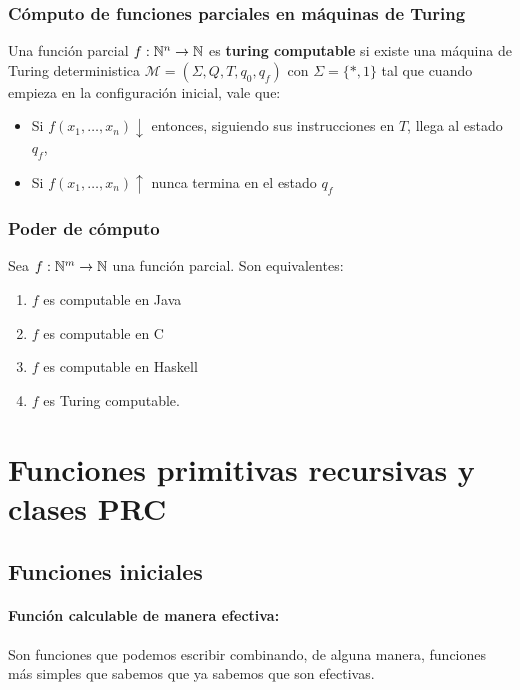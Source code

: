 	
	\subsubsection{Cómputo de funciones parciales en máquinas de Turing}
	Una función parcial $f:\mathbb{N}^n\to\mathbb{N}$ es \textbf{turing computable} si existe una máquina de Turing deterministica $\mathcal{M}=(\Sigma, Q, T, q_0, q_f)$ con $\Sigma=\{*,1\}$ tal que cuando empieza en la configuración inicial, vale que:
	
	\begin{itemize}
		\item Si $f(x_1,\dots, x_n)\downarrow$ entonces, siguiendo sus instrucciones en $T$, llega al estado $q_f$,
		\item  Si $f(x_1,\dots, x_n)\uparrow$ nunca termina en el estado $q_f$
	\end{itemize}
	

	
	\subsubsection{Poder de  cómputo}
	
	Sea $f:\mathbb{N}^m\to\mathbb{N}$ una función parcial. Son equivalentes:
	\begin{multicols}{2}
	\begin{enumerate}
	\item $f$ es computable en Java
	\item $f$ es computable en C
	\item $f$ es computable en Haskell
	\item $f$ es Turing computable.
\end{enumerate}
	\end{multicols}
	
	\newpage
	\section{Funciones primitivas recursivas y clases PRC}
	\subsection{Funciones iniciales}
	\paragraph{Función calculable de manera efectiva:} Son funciones que podemos escribir combinando, de alguna manera, funciones más simples que sabemos que ya sabemos que son efectivas.
	
